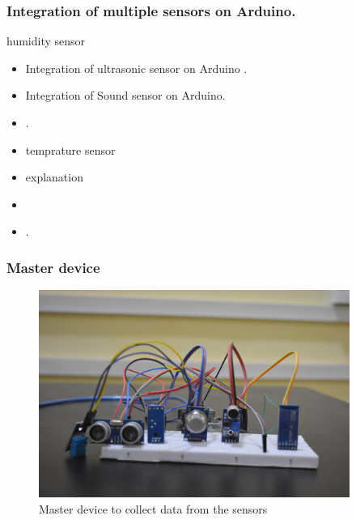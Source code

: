\documentclass{beamer}
\begin{document}
 \begin{frame}\frametitle{Integration of multiple sensors on Arduino.}
 \item humidity sensor 
\begin{itemize}
\item Integration of ultrasonic sensor on Arduino .
\item Integration of Sound sensor on Arduino.
\item .
\item temprature sensor 
\item explanation
\item 
\item
.

\end{itemize}
\end{frame}

\begin{frame}\frametitle{Master device}
\begin{itemize}
  \begin{figure}[H]
  \centerline{\includegraphics[width=4.0in]{master2.JPG}}
  \caption{ \textbf{}Master device to collect data from the sensors}
  \end{figure}
\end{itemize}
\end{frame}
\end{document}
